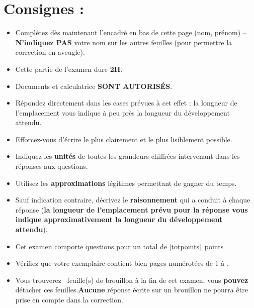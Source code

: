 \section*{Consignes :}
\begin{itemize}
\item Complétez dès maintenant l'encadré en bas de cette page (nom, prénom) – \textbf{N'indiquez \textbf{PAS}} votre nom sur les autres feuilles (pour permettre la correction en aveugle).\\
\item Cette partie de l'examen dure \textbf{2H}.
\item Documents et calculatrice \textbf{SONT AUTORISÉS}. %
\item Répondez directement dans les cases prévues à cet effet : la longueur de l'emplacement vous indique à peu près la longueur du développement attendu.
\item Efforcez-vous d'écrire le plus clairement et le plus lisiblement possible.\\
\item Indiquez les \textbf{unités} de toutes les grandeurs chiffrées intervenant dans les réponses aux questions.
\item Utilisez les \textbf{approximations} légitimes permettant de gagner du temps.
\item Sauf indication contraire, décrivez le \textbf{raisonnement} qui a conduit à chaque réponse (\textbf{la longueur de l'emplacement prévu pour la réponse vous indique approximativement la longueur du développement attendu}).\\
\item Cet examen comporte  questions pour un total de \ref{totpoints}~points %
\item Vérifiez que votre exemplaire contient bien \pageref{LastPage} pages numérotées de 1 à \pageref{LastPage}.
\item Vous trouverez ~feuille(s) de brouillon à la fin de cet examen, vous \textbf{pouvez} détacher ces feuilles.\textbf{Aucune} réponse écrite sur un brouillon ne pourra être prise en compte dans la correction.
\end{itemize}
